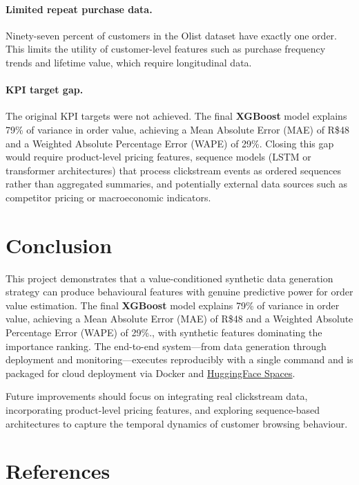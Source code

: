 \documentclass[11pt,a4paper]{article}
\begin{document}
\paragraph{Limited repeat purchase data.}
Ninety-seven percent of customers in the Olist dataset have exactly one order.
This limits the utility of customer-level features such as purchase frequency
trends and lifetime value, which require longitudinal data.

\paragraph{KPI target gap.}
The original KPI targets were not achieved. The final \textbf{XGBoost} model explains 79\% of variance in order value, achieving a Mean Absolute Error (MAE) of R\$48 and a Weighted Absolute Percentage Error (WAPE) of 29\%. Closing this gap would require product-level pricing
features, sequence models (LSTM or transformer architectures) that process
clickstream events as ordered sequences rather than aggregated summaries, and
potentially external data sources such as competitor pricing or macroeconomic
indicators.

\section{Conclusion}
\label{sec:conclusion}

This project demonstrates that a value-conditioned synthetic data generation
strategy can produce behavioural features with genuine predictive power for
order value estimation.  The final \textbf{XGBoost} model explains 79\% of variance in order value, achieving a Mean Absolute Error (MAE) of R\$48 and a Weighted Absolute Percentage Error (WAPE) of 29\%., with synthetic features dominating the importance ranking.  The end-to-end system---from data generation through deployment and monitoring---executes reproducibly with a single command and is packaged for cloud deployment via Docker and \href{https://huggingface.co/spaces/alitonia/customer_value_prediction}{HuggingFace Spaces}.

Future improvements should focus on integrating real clickstream data,
incorporating product-level pricing features, and exploring sequence-based
architectures to capture the temporal dynamics of customer browsing behaviour.

\section*{References}
\end{document}
